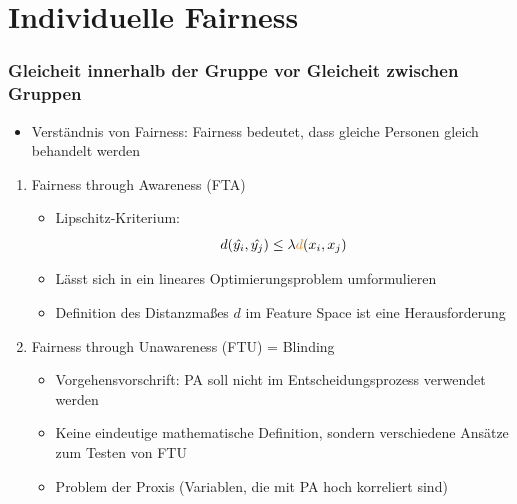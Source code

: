 \documentclass[aspectratio=169]{beamer}
\begin{document}
\section{Individuelle Fairness}
\begin{frame}
    \frametitle{Gleicheit innerhalb der Gruppe vor Gleicheit zwischen Gruppen}
	\begin{itemize}
		\item Verständnis von Fairness: Fairness bedeutet, dass gleiche Personen gleich behandelt werden
	\end{itemize}
    \begin{enumerate}
		\item Fairness through Awareness (FTA)
        \begin{itemize}
            \item Lipschitz-Kriterium:
            \[
            d(\hat{y_i}, \hat{y_j}) \leq \lambda {\color{orange}{d}}(x_i, x_j)
            \]
            \item Lässt sich in ein lineares Optimierungsproblem umformulieren
            \item Definition des {\color{orange}Distanzmaßes $d$} im Feature Space ist eine Herausforderung
        \end{itemize}

        \item Fairness through Unawareness (FTU) = Blinding
        \begin{itemize}
            \item Vorgehensvorschrift: PA soll nicht im Entscheidungsprozess verwendet werden
            \item Keine eindeutige mathematische Definition, sondern verschiedene Ansätze zum Testen von FTU
            \item Problem der Proxis (Variablen, die mit PA hoch korreliert sind)
        \end{itemize}
    \end{enumerate}
\end{frame}
\end{document}
